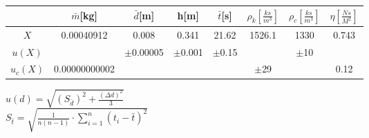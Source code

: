 \documentclass{article}
\begin{document}
\begin{tabular}{|c|c|c|c|c|c|c|c|}
    \hline
    \cellcolor{cyan!50}&\cellcolor{cyan!50}$\bar{m}$[kg]&\cellcolor{cyan!50}$\bar{d}$[m]&\cellcolor{cyan!50}h[m]&\cellcolor{cyan!50}$\bar{t}$[s]&\cellcolor{cyan!50}$\rho_{k}\left[\frac{ks}{m^{3}}\right]$&\cellcolor{cyan!50}$\rho_{c}$$\left[\frac{ks}{m^{3}}\right]$&\cellcolor{cyan!50}$\eta\left[\frac{Ns}{M^{2}}\right]$\\
    \hline 
    \cellcolor{cyan!50}$X$ &\cellcolor{cyan!50}0.00040912&\cellcolor{cyan!50}0.008&\cellcolor{cyan!50}0.341&\cellcolor{cyan!50}21.62&\cellcolor{cyan!50}1526.1&\cellcolor{cyan!50}1330&\cellcolor{cyan!50}0.743\\\hline
    \cellcolor{cyan!50}$u(X)$&\cellcolor{gray}&\cellcolor{cyan!50}$\pm$0.00005&\cellcolor{cyan!50}$\pm$0.001&\cellcolor{cyan!50}$\pm$0.15&\cellcolor{gray}&\cellcolor{cyan!50}$\pm$10&\cellcolor{gray}\\\hline
    \cellcolor{cyan!50}$u_{c}(X)$&\cellcolor{cyan!50}0.00000000002&\cellcolor{gray}&\cellcolor{gray}&\cellcolor{gray}&\cellcolor{cyan!50}$\pm$29&\cellcolor{gray}&\cellcolor{cyan!50}0.12\\\hline
\end{tabular}


$u(d)=\sqrt{\left(S_{\bar{d}}\right)^{2}+\frac{(\Delta d)^{2}}{3}}$\\
$S_{\bar{t}}=\sqrt{\frac{1}{n(n-1)}\cdot\sum^{n}_{i=1}\left(t_{i}-\bar{t}\right)^{2}}$\\
\end{document}

